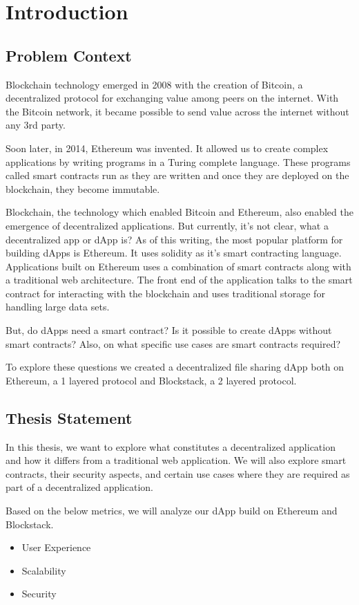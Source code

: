 \section{Introduction}\label{sec::introduction}

\subsection{Problem Context}
Blockchain technology emerged in 2008 with the creation of Bitcoin, a decentralized protocol for exchanging value among peers on the internet. With the Bitcoin network, it became possible to send value across the internet without any 3rd party.

Soon later, in 2014, Ethereum was invented. It allowed us to create complex applications by writing programs in a Turing complete language. These programs called smart contracts run as they are written and once they are deployed on the blockchain, they become immutable.

Blockchain, the technology which enabled Bitcoin and Ethereum, also enabled the emergence of decentralized applications. But currently, it's not clear, what a decentralized app or dApp is? As of this writing, the most popular platform for building dApps is Ethereum. It uses solidity as it's smart contracting language. Applications built on Ethereum uses a combination of smart contracts along with a traditional web architecture. The front end of the application talks to the smart contract for interacting with the blockchain and uses traditional storage for handling large data sets.

But, do dApps need a smart contract? Is it possible to create dApps without smart contracts? Also, on what specific use cases are smart contracts required?

To explore these questions we created a decentralized file sharing dApp both on Ethereum, a 1 layered protocol and Blockstack, a 2 layered protocol. 

\subsection{Thesis Statement}
In this thesis, we want to explore what constitutes a decentralized application and how it differs from a traditional web application. We will also explore smart contracts, their security aspects, and certain use cases where they are required as part of a decentralized application.

Based on the below metrics, we will analyze our dApp build on Ethereum and Blockstack.
\begin{itemize}
	\item User Experience
	\item Scalability
	\item Security
\end{itemize}

